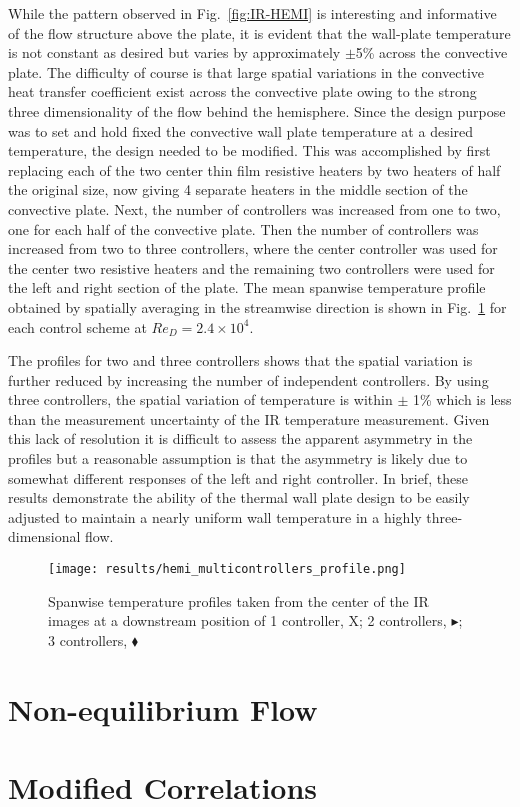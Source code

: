 While the pattern observed in Fig.~\ref{fig:IR-HEMI} is interesting and informative of the flow structure above the plate, it is evident that the wall-plate temperature is not constant as desired but varies by approximately $\pm$5\% across the convective plate. 
The difficulty of course is that large spatial variations in the convective heat transfer coefficient exist across the convective plate owing to the strong three dimensionality of the flow behind the hemisphere. 
Since the design purpose was to set and hold fixed the convective wall plate temperature at a desired temperature, the design needed to be modified. 
This was accomplished by first replacing each of the two center thin film resistive heaters by two heaters of half the original size, now giving 4 separate heaters in the middle section of the convective plate. 
Next, the number of controllers was increased from one to two, one for each half of the convective plate. 
Then the number of controllers was increased from two to three controllers, where the center controller was used for the center two resistive heaters and the remaining two controllers were used for the left and right section of the plate. 
The mean spanwise temperature profile obtained by spatially averaging in the streamwise direction is shown in Fig.~\ref{fig:hemi-control}  for each control scheme at $Re_D = 2.4 \times 10^4$. 

The profiles for two and three controllers shows that the spatial variation is further reduced by increasing the number of independent controllers. 
By using three controllers, the spatial variation of temperature is within $\pm$ 1\% which is less than the measurement uncertainty of the IR temperature measurement. 
Given this lack of resolution it is difficult to assess the apparent asymmetry in the profiles but a reasonable assumption is that the asymmetry is likely due to somewhat different responses of the left and right controller. 
In brief, these results demonstrate the ability of the thermal wall plate design to be easily adjusted to maintain a nearly uniform wall temperature in a highly three-dimensional flow.

\begin{figure}[h!]
\centering
\texttt{[image: results/hemi\_multicontrollers\_profile.png]}
\caption{{\footnotesize Spanwise temperature profiles taken from the center of the IR images at a downstream position of 1 controller, {\color{blue}X};  2 controllers, {\color{green}$\blacktriangleright$}; 3 controllers, {\color{red}$\blacklozenge$}}}
\label{fig:hemi-control}
\end{figure}


\section{Non-equilibrium Flow}



\section{Modified Correlations}